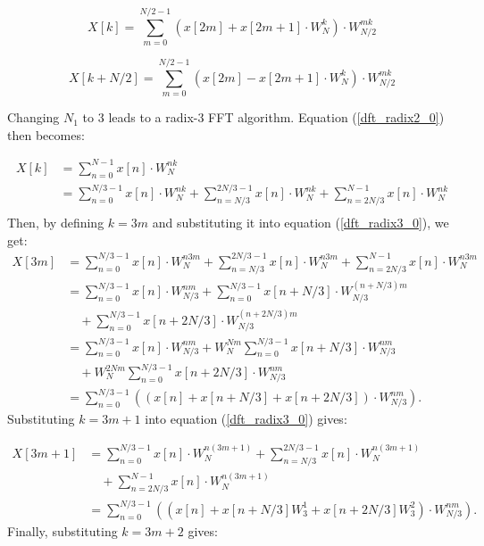 \documentclass[a4paper,12pt, master]{etf}
\begin{document}
\begin{equation}
    X[k] = \sum_{m=0}^{N/2-1} (x[2m] + x[2m + 1] \cdot W_N^{k}) \cdot W_{N/2}^{mk}
\label{fft_radix2_0}
\end{equation}

\begin{equation}
    X[k+N/2] = \sum_{m=0}^{N/2-1} (x[2m] - x[2m + 1] \cdot W_N^{k}) \cdot W_{N/2}^{mk}
\label{fft_radix2_1}
\end{equation}

Changing $N_1$ to 3 leads to a radix-3 FFT algorithm. Equation (\ref{dft_radix2_0}) then becomes:

\begin{equation}
\begin{split}
    X[k] &= \sum_{n=0}^{N-1} x[n] \cdot W_N^{nk} \\
    &= \sum_{n=0}^{N/3-1} x[n] \cdot W_N^{nk} + \sum_{n=N/3}^{2N/3-1} x[n] \cdot W_N^{nk} + \sum_{n=2N/3}^{N-1} x[n] \cdot W_N^{nk} \\
\label{dft_radix3_0}
\end{split}
\end{equation}
Then, by defining $k=3m$ and substituting it into equation (\ref{dft_radix3_0}), we get:
\begin{equation}
\begin{split}
    X[3m] &= \sum_{n=0}^{N/3-1} x[n] \cdot W_N^{n3m} + \sum_{n=N/3}^{2N/3-1} x[n] \cdot W_N^{n3m} + \sum_{n=2N/3}^{N-1} x[n] \cdot W_N^{n3m} \\
    &= \sum_{n=0}^{N/3-1} x[n] \cdot W_{N/3}^{nm} + \sum_{n=0}^{N/3-1} x[n+N/3] \cdot W_{N/3}^{(n+N/3)m} \\
    &\quad + \sum_{n=0}^{N/3-1} x[n+2N/3] \cdot W_{N/3}^{(n+2N/3)m} \\
    &= \sum_{n=0}^{N/3-1} x[n] \cdot W_{N/3}^{nm} +  W_N^{Nm} \sum_{n=0}^{N/3-1} x[n+N/3] \cdot W_{N/3}^{nm} \\
    &\quad + W_N^{2Nm} \sum_{n=0}^{N/3-1} x[n+2N/3] \cdot W_{N/3}^{nm} \\
    &= \sum_{n=0}^{N/3-1} ((x[n] + x[n + N/3] + x[n + 2N/3]) \cdot W_{N/3}^{nm}).
\end{split}
\label{dft_radix3_1}
\end{equation}
Substituting $k=3m+1$ into equation (\ref{dft_radix3_0}) gives:

\begin{equation}
\begin{split}
    X[3m+1] &= \sum_{n=0}^{N/3-1} x[n] \cdot W_N^{n(3m+1)} + \sum_{n=N/3}^{2N/3-1} x[n] \cdot W_N^{n(3m+1)} \\
    &\quad + \sum_{n=2N/3}^{N-1} x[n] \cdot W_N^{n(3m+1)} \\
    &= \sum_{n=0}^{N/3-1} ((x[n] + x[n + N/3]W_3^{1} + x[n + 2N/3]W_3^{2}) \cdot W_{N/3}^{nm}).
\end{split}
\label{dft_radix3_2}
\end{equation}
Finally, substituting $k=3m+2$ gives:
\end{document}
